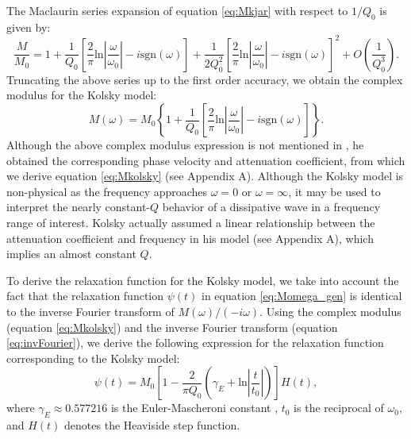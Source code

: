 \documentclass[article]{./macros/elsarticle_qh}
\begin{document}
The Maclaurin series expansion of equation \ref{eq:Mkjar} with respect to $1/Q_{0}$ is given by:
\begin{equation} \label{eq:Mkjar_appr}
\frac{M}{M_{0}} = 1 + 
\frac{1}{Q_{0}}
\left[\frac{2}{\pi} \text{ln} \left|\frac{\omega}{\omega_{0}}\right| - i \text{sgn}(\omega) \right] 
+ \frac{1}{2Q_{0}^2} 
\left[\frac{2}{\pi} \text{ln}\left|\frac{\omega}{\omega_{0}}\right| - i \text{sgn}(\omega) \right]^2  +  
O\left(\frac{1}{Q_{0}^3}\right) .
\end{equation}
Truncating the above series up to the first order accuracy, we obtain the complex modulus for the Kolsky model:
\begin{equation} \label{eq:Mkolsky}
M(\omega) = M_{0} \left \{
1 + \frac{1}{Q_{0}}
\left[\frac{2}{\pi} \text{ln}\left|\frac{\omega}{\omega_{0}}\right| - i \text{sgn}(\omega) \right]  
\right \} .
\end{equation}
Although the above complex modulus expression is not mentioned in \cite{kolsky:1956}, he obtained the corresponding phase velocity and attenuation coefficient, from which we derive equation \ref{eq:Mkolsky} (see Appendix A). Although the Kolsky model is non-physical as the frequency approaches $\omega=0$ or $\omega=\infty$, it may be used to interpret the nearly constant-$Q$ behavior of a dissipative wave in a frequency range of interest. Kolsky actually assumed a linear relationship between the attenuation coefficient and frequency in his model (see Appendix A), which implies an almost constant $Q$.  

To derive the relaxation function for the Kolsky model, we take into account the fact that the relaxation function $\psi(t)$ in equation \ref{eq:Momega_gen} is identical to the inverse Fourier transform of $M(\omega)/(-i \omega)$. Using the complex modulus (equation \ref{eq:Mkolsky}) and the inverse Fourier transform (equation \ref{eq:invFourier}), we derive the following expression for the relaxation function corresponding to the Kolsky model:
\begin{equation} \label{eq:psi_kols}
\psi(t) = M_{0} \left[
1 - \frac{2}{\pi Q_{0}}\left(\gamma_{E} + 
\text{ln}\left| \frac{t}{t_{0}} \right| \right)  
\right] H(t),
\end{equation}
where $\gamma_{E} \approx 0.577216$ is the Euler-Mascheroni constant \cite[]{arfken:2013}, $t_{0}$ is the reciprocal of $\omega_{0}$, and $H(t)$ denotes the Heaviside step function. 
\end{document}
